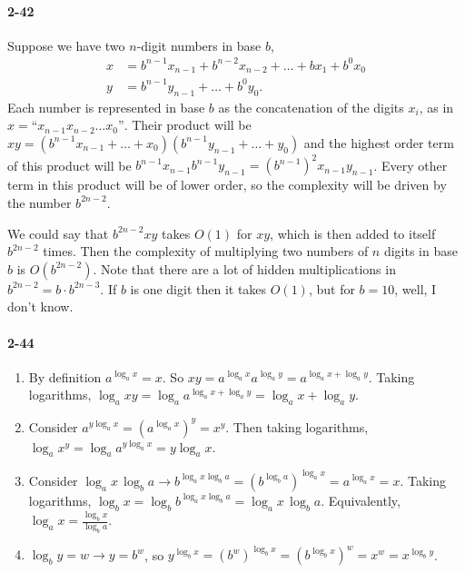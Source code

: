 \documentclass{report}
\begin{document}
\paragraph{2-42} Suppose we have two $n$-digit numbers in base $b$,
\begin{align*}
	x &= b^{n-1} x_{n-1} + b^{n-2} x_{n-2} + \ldots + b x_1 + b^0 x_0 \\
	y &= b^{n-1} y_{n-1} + \ldots + b^0 y_0.
\end{align*}
Each number is represented in base $b$ as the concatenation of the digits $x_i$, as in $x = \text{``}x_{n-1}x_{n-2}\ldots x_0\text{''}$. Their product will be $xy = (b^{n-1}x_{n-1} + \ldots + x_0)(b^{n-1} y_{n-1} + \ldots + y_0)$ and the highest order term of this product will be $b^{n-1} x_{n-1} b^{n-1} y_{n-1} = (b^{n-1})^2 x_{n-1}y_{n-1}$. Every other term in this product will be of lower order, so the complexity will be driven by the number $b^{2n-2}$.

We could say that $b^{2n-2} xy$ takes $O(1)$ for $xy$, which is then added to itself $b^{2n-2}$ times. Then the complexity of multiplying two numbers of $n$ digits in base $b$ is $O(b^{2n-2})$. Note that there are a lot of hidden multiplications in $b^{2n-2} = b\cdot b^{2n-3}$. If $b$ is one digit then it takes $O(1)$, but for $b=10$, well, I don't know.

\paragraph{2-44}
\begin{enumerate}[label=(\alph*)]
	\item By definition $a^{\log_a x} = x$. So $xy = a^{\log_a x} a^{\log_a y} = a^{\log_a x + \log_a y}$. Taking logarithms, $\log_a xy = \log_a a^{\log_a x + \log_a y} = \log_a x + \log_a y.$
	\item Consider $a^{y\log_a x} = \left(a^{\log_a x}\right)^y = x^y.$ Then taking logarithms, $\log_a x^y = \log_a a^{y\log_a x} = y\log_a x$.
	\item Consider $\log_a x\, \log_b a \to b^{\log_a x \log_b a} = \left(b^{\log_b a}\right)^{\log_a x} = a^{\log_a x} = x$. Taking logarithms, $\log_b x = \log_b b^{\log_a x \log_b a} = \log_a x\,\log_b a$. Equivalently, $\log_a x = \frac{\log_b x}{\log_b a}$.
	\item $\log_b y = w \to y = b^w$, so $y^{\log_b x} = \left(b^w\right)^{\log_b x} = \left(b^{\log_b x}\right)^w = x^w = x^{\log_b y}$.
\end{enumerate}
\end{document}
